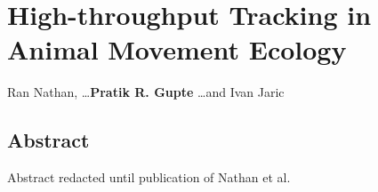 \chapter{High-throughput Tracking in Animal Movement Ecology}\label{ch:htme}

{\noindent \sffamily Ran Nathan, \ldots \textbf{Pratik R. Gupte} \ldots and Ivan Jaric}

\section*{Abstract}


\noindent Abstract redacted until publication of Nathan et al.

\clearpage
